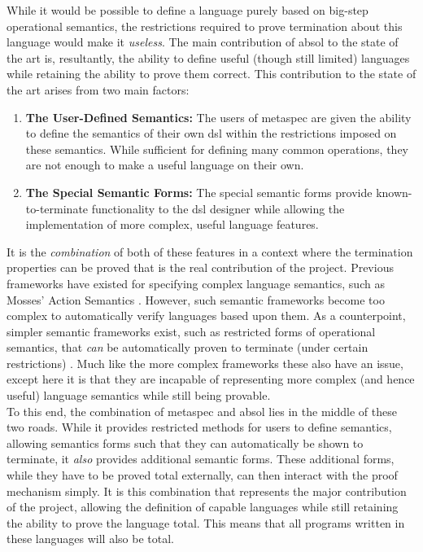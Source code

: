 While it would be possible to define a language purely based on big-step operational semantics, the restrictions required to prove termination about this language would make it \textit{useless}.
The main contribution of \gls{absol} to the state of the art is, resultantly, the ability to define useful (though still limited) languages while retaining the ability to prove them correct.
This contribution to the state of the art arises from two main factors:
\begin{enumerate}
    \item \textbf{The User-Defined Semantics:} The users of \gls{metaspec} are given the ability to define the semantics of their own \gls{dsl} within the restrictions imposed on these semantics.
    While sufficient for defining many common operations, they are not enough to make a useful language on their own.
    \item \textbf{The Special Semantic Forms:} The special semantic forms provide known-to-terminate functionality to the \gls{dsl} designer while allowing the implementation of more complex, useful language features.
\end{enumerate}

It is the \textit{combination} of both of these features in a context where the termination properties can be proved that is the real contribution of the project.
Previous frameworks have existed for specifying complex language semantics, such as Mosses' Action Semantics \citep{mosses1992action}. 
However, such semantic frameworks become too complex to automatically verify languages based upon them.
As a counterpoint, simpler semantic frameworks exist, such as restricted forms of operational semantics, that \textit{can} be automatically proven to terminate (under certain restrictions) \citep{Zhang:2004:SSD:981009.981013}.
Much like the more complex frameworks these also have an issue, except here it is that they are incapable of representing more complex (and hence useful) language semantics while still being provable.\\

To this end, the combination of \gls{metaspec} and \gls{absol} lies in the middle of these two roads.
While it provides restricted methods for users to define semantics, allowing semantics forms such that they can automatically be shown to terminate,
it \textit{also} provides additional semantic forms.
These additional forms, while they have to be proved total externally, can then interact with the proof mechanism simply. 
It is this combination that represents the major contribution of the project, allowing the definition of capable languages while still retaining the ability to prove the language total.
This means that all programs written in these languages will also be total.\\


